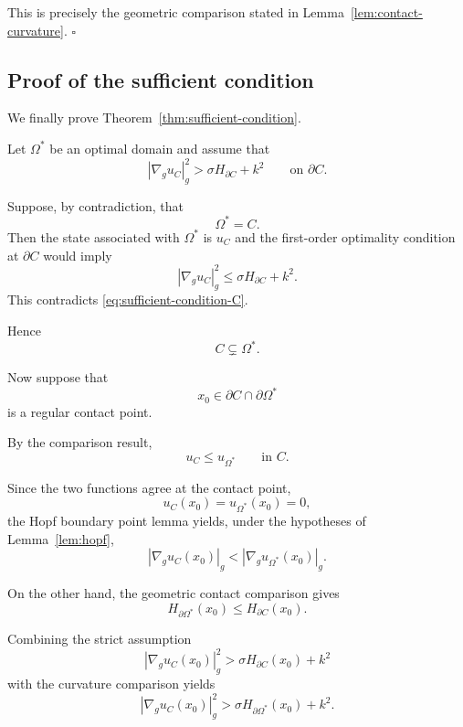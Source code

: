 \documentclass{article}
\begin{document}
This is precisely the geometric comparison stated in
Lemma~\ref{lem:contact-curvature}.
\hfill$\square$

\subsection{Proof of the sufficient condition}
\label{subsec:proof-sufficient}

We finally prove Theorem~\ref{thm:sufficient-condition}.

Let $\Omega^\ast$ be an optimal domain and assume that
\[
|\nabla_g u_C|_g^2
>
\sigma H_{\partial C}+k^2
\qquad\text{on }\partial C.
\label{eq:strict-condition-proof}
\]

Suppose, by contradiction, that
\[
\Omega^\ast=C.
\]
Then the state associated with $\Omega^\ast$ is $u_C$ and the
first-order optimality condition at $\partial C$ would imply
\[
|\nabla_g u_C|_g^2
\leq
\sigma H_{\partial C}+k^2.
\]
This contradicts
\eqref{eq:sufficient-condition-C}.

Hence
\begin{equation}
C\subsetneq\Omega^\ast.
\label{eq:strict-inclusion}
\end{equation}

Now suppose that
\[
x_0\in\partial C\cap\partial\Omega^\ast
\]
is a regular contact point.

By the comparison result,
\[
u_C\leq u_{\Omega^\ast}
\qquad\text{in }C.
\]

Since the two functions agree at the contact point,
\[
u_C(x_0)=u_{\Omega^\ast}(x_0)=0,
\]
the Hopf boundary point lemma yields, under the hypotheses of
Lemma~\ref{lem:hopf},
\begin{equation}
|\nabla_g u_C(x_0)|_g
<
|\nabla_g u_{\Omega^\ast}(x_0)|_g.
\label{eq:hopf-gradient-comparison}
\end{equation}

On the other hand, the geometric contact comparison gives
\[
H_{\partial\Omega^\ast}(x_0)
\leq
H_{\partial C}(x_0).
\]

Combining the strict assumption
\[
|\nabla_g u_C(x_0)|_g^2
>
\sigma H_{\partial C}(x_0)+k^2
\]
with the curvature comparison yields
\begin{equation}
|\nabla_g u_C(x_0)|_g^2
>
\sigma H_{\partial\Omega^\ast}(x_0)+k^2.
\label{eq:strict-contact-lower-bound}
\end{equation}
\end{document}
